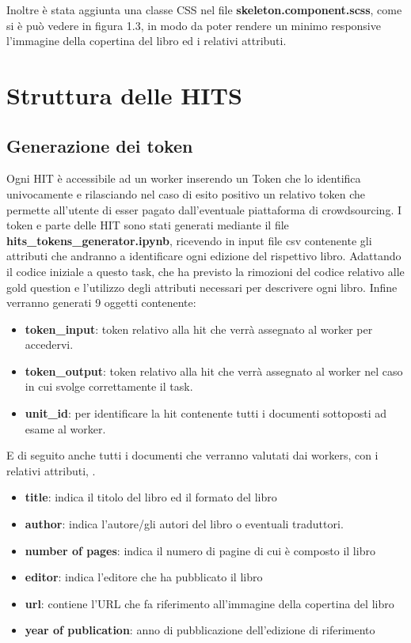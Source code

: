 \documentclass[a4paper,11pt]{report}
\begin{document}
Inoltre è stata aggiunta una classe CSS nel file \textbf{skeleton.component.scss}, come si è può vedere in figura 1.3, in modo da poter rendere un minimo responsive l'immagine della copertina del libro ed i relativi attributi.

\section{Struttura delle HITS}
\subsection{Generazione dei token}
Ogni HIT è accessibile ad un worker inserendo un Token che lo identifica univocamente e rilasciando nel caso di esito positivo un relativo token che permette all'utente di esser pagato dall'eventuale piattaforma di crowdsourcing.
I token e parte delle HIT sono stati generati mediante il file \textbf{hits\_tokens\_generator.ipynb}, ricevendo in input file csv contenente gli attributi che andranno a identificare ogni edizione del rispettivo libro. Adattando il codice iniziale a questo task, che ha previsto la rimozioni del codice relativo alle gold question e l'utilizzo degli attributi necessari per descrivere ogni libro. Infine verranno generati 9 oggetti contenente:
\begin{itemize}
	\item \textbf{token\_input}: token relativo alla hit che verrà assegnato al worker per accedervi.
	\item \textbf{token\_output}: token relativo alla hit che verrà assegnato al worker nel caso in cui svolge correttamente il task.
	\item \textbf{unit\_id}: per identificare la hit contenente tutti i documenti sottoposti ad esame al worker.
\end{itemize}
 E di seguito anche tutti i documenti che verranno valutati dai workers, con i relativi attributi, .
\begin{itemize}
	\item \textbf{title}: indica il titolo del libro ed il formato del libro
	\item \textbf{author}: indica l'autore/gli autori del libro o eventuali traduttori.
	\item \textbf{number of pages}: indica il numero di pagine di cui è composto il libro
	\item \textbf{editor}: indica l'editore che ha pubblicato il libro
	\item \textbf{url}: contiene l'URL che fa riferimento all'immagine della copertina del libro
	\item \textbf{year of publication}: anno di pubblicazione dell'edizione di riferimento
\end{itemize}
\end{document}
